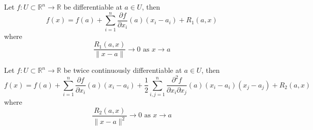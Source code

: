 \documentclass[openany]{book}
\newcommand{\R}{\mathbb{R}}
\begin{document}
\begin{defn}
    Let $f:U\subset\R^n\to\R$ be differentiable at $a\in U$, then 
    \begin{equation*}
        f(x)=f(a)+\sum_{i=1}^n\frac{\partial f}{\partial x_i}(a)(x_i-a_i)+R_1(a,x)
    \end{equation*}
    where 
    \begin{equation*}
        \frac{R_1(a,x)}{\|x-a\|}\to 0 \text{ as } x\to a
    \end{equation*}
\end{defn}

\begin{defn}\label{taylor}
    Let $f:U\subset\R^n\to\R$ be twice continuously differentiable at $a\in U$, then 
    \begin{equation*}
        f(x)=f(a)+\sum_{i=1}^n\frac{\partial f}{\partial x_i}(a)(x_i-a_i)+\frac{1}{2}\sum_{i,j=1}^n\frac{\partial^2 f}{\partial x_i\partial x_j}(a)(x_i-a_i)(x_j-a_j)+R_2(a,x)
    \end{equation*}
    where 
    \begin{equation*}
        \frac{R_2(a,x)}{\|x-a\|^2}\to 0 \text{ as } x\to a
    \end{equation*}
\end{defn}




\end{document}
